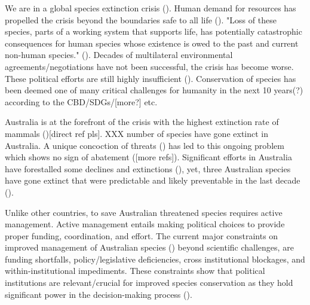 \documentclass[a4paper,11pt]{article}
\begin{document}
We are in a global species extinction crisis (\cite{ceballosAcceleratedModernHuman2015,lewisDefiningAnthropocene2015,laybournlangton2019,IPBES2019[TODO]}). Human demand for resources has propelled the crisis beyond the boundaries safe to all life (\cite{maxwellBiodiversityRavagesGuns2016, sternerPolicyDesignAnthropocene2019}). "Loss of these species, parts of a working system that supports life, has potentially catastrophic consequences for human species whose existence is owed to the past and current non-human species." (\cite{burkeSpeciesBordersPolitical2020}). Decades of multilateral environmental agreements/negotiations have not been successful, the crisis has become worse. These political efforts are still highly insufficient (\cite{rockstrom2009[TODO]}). Conservation of species has been deemed one of many critical challenges for humanity in the next 10 years(?) according to the CBD/SDGs/[more?] etc.

Australia is at the forefront of the crisis with the highest extinction rate of mammals (\cite{simmondsVulnerableSpeciesEcosystems2020})[direct ref pls]. XXX number of species have gone extinct in Australia. A unique concoction of threats (\cite{kearneyThreatsAustraliaImperilled2019}) has led to this ongoing problem which shows no sign of abatement (\cite{simmondsVul,nerableSpeciesEcosystems2020}[more refs]). Significant efforts in Australia have forestalled some declines and extinctions (\cite{kearneyThreatsAustraliaImperilled2019}), yet, three Australian species have gone extinct that were predictable and likely preventable in the last decade (\cite{woinarskiContributionPolicyLaw2017}).

Unlike other countries, to save Australian threatened species requires active management. Active management entails making political choices to provide proper funding, coordination, and effort. The current major constraints on improved management of Australian species (\cite{leggeMonitoringThreatenedSpecies2018,wintleSpendingWhatWill2019, wawardLotsLossLittle2019, simmondsVulnerableSpeciesEcosystems2020, kearney et al, woinarski et al}) beyond scientific challenges, are funding shortfalls, policy/legislative deficiencies, cross institutional blockages, and within-institutional impediments. These constraints show that political institutions are relevant/crucial for improved species conservation as they hold significant power in the decision-making process (\cite{rydenLinkingDemocracyBiodiversity2020}).
\end{document}
